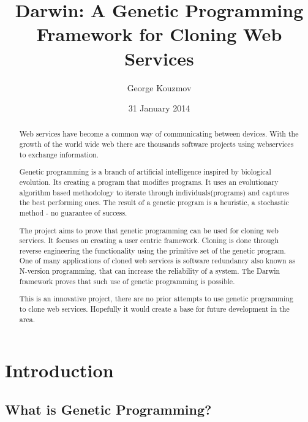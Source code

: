 \documentclass{l4proj}
\begin{document}
\title{Darwin: A Genetic Programming Framework for Cloning Web Services}
\author{George Kouzmov}
\date{31 January 2014}
\maketitle

\begin{abstract}
Web services have become a common way of communicating between devices. With the growth of the
world wide web there are thousands software projects using webservices to exchange information.

Genetic programming is a branch of artificial intelligence inspired by biological evolution. Its creating a program that modifies programs.
It uses an evolutionary algorithm based methodology to iterate through individuals(programs) and captures the best performing ones.
The result of a genetic program is a heuristic, a stochastic method - no guarantee of success.

The project aims to prove that genetic programming can be used for cloning web services. It focuses
on creating a user centric framework. Cloning is done through reverse engineering the functionality using the primitive set of the genetic program.
 One of many applications of cloned web services is software redundancy
also known as N-version programming, that can increase the reliability of a system.
The Darwin framework proves that such use of genetic programming is possible.

This is an innovative project, there are no prior attempts to use genetic programming to clone
web services. Hopefully it would create a base for future development in the area. 
\end{abstract}

\renewcommand{\abstractname}{Acknowledgements}
\begin{abstract}

\end{abstract}

\tableofcontents
\listoffigures
\listoftables



\chapter{Introduction}

\section{What is Genetic Programming?}

\end{document}
